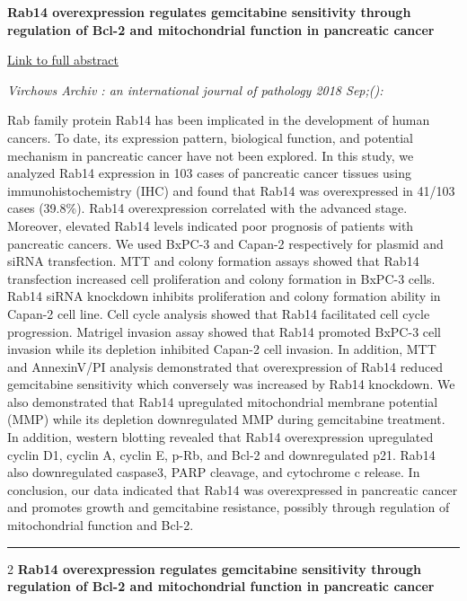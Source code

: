 \documentclass[]{article}
\begin{document}
 \textbf{Rab14 overexpression regulates gemcitabine sensitivity through
regulation of Bcl-2 and mitochondrial function in pancreatic cancer}

\href{https://www.ncbi.nlm.nih.gov/pubmed/?term=30267303}{Link to full
abstract}

\emph{Virchows Archiv : an international journal of pathology 2018
Sep;():}

Rab family protein Rab14 has been implicated in the development of human
cancers. To date, its expression pattern, biological function, and
potential mechanism in pancreatic cancer have not been explored. In this
study, we analyzed Rab14 expression in 103 cases of pancreatic cancer
tissues using immunohistochemistry (IHC) and found that Rab14 was
overexpressed in 41/103 cases (39.8\%). Rab14 overexpression correlated
with the advanced stage. Moreover, elevated Rab14 levels indicated poor
prognosis of patients with pancreatic cancers. We used BxPC-3 and
Capan-2 respectively for plasmid and siRNA transfection. MTT and colony
formation assays showed that Rab14 transfection increased cell
proliferation and colony formation in BxPC-3 cells. Rab14 siRNA
knockdown inhibits proliferation and colony formation ability in Capan-2
cell line. Cell cycle analysis showed that Rab14 facilitated cell cycle
progression. Matrigel invasion assay showed that Rab14 promoted BxPC-3
cell invasion while its depletion inhibited Capan-2 cell invasion. In
addition, MTT and AnnexinV/PI analysis demonstrated that overexpression
of Rab14 reduced gemcitabine sensitivity which conversely was increased
by Rab14 knockdown. We also demonstrated that Rab14 upregulated
mitochondrial membrane potential (MMP) while its depletion downregulated
MMP during gemcitabine treatment. In addition, western blotting revealed
that Rab14 overexpression upregulated cyclin D1, cyclin A, cyclin E,
p-Rb, and Bcl-2 and downregulated p21. Rab14 also downregulated
caspase3, PARP cleavage, and cytochrome c release. In conclusion, our
data indicated that Rab14 was overexpressed in pancreatic cancer and
promotes growth and gemcitabine resistance, possibly through regulation
of mitochondrial function and Bcl-2.

{}

{}

\begin{center}\rule{0.5\linewidth}{\linethickness}\end{center}

 2 \textbf{Rab14 overexpression regulates gemcitabine sensitivity
through regulation of Bcl-2 and mitochondrial function in pancreatic
cancer}
\end{document}
